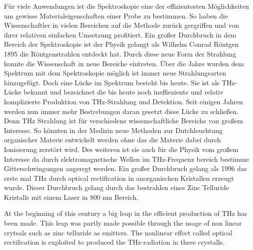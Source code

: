 Für viele Anwendungen ist die Spektroskopie eine der effizientesten Möglichkeiten um gewisse Materialeigenschaften einer Probe zu bestimmen.
So haben die Wissenschaftler in vielen Bereichen auf die Methode zurück gergriffen und von ihrer relativen einfachen Umsetzung profitiert.
Ein großer Durchbruch in dem Bereich der Spektroskopie ist der Physik gelangt als Wilhelm Conrad Röntgen 1895 %
die Röntgenstrahlen entdeckt hat.
Durch diese neue Form der Strahlung konnte die Wissenschaft in neue Bereiche eintreten.
Über die Jahre wurden dem Spektrum mit dem Spektroskopie möglich ist immer neue Strahlungsarten hinzugefügt.
Doch eine Lücke im Spektrum besteht bis heute.
Sie ist als THz-Lücke bekannt und bezeichnet die bis heute noch ineffieziente und relativ komplizierte Produktion von THz-Strahlung und Detektion.
Seit einigen Jahren werden nun immer mehr Bestrebungen daran gesetzt diese Lücke zu schließen.
Denn THz Strahlung ist für verschiedene wissenschaftliche Bereiche von großem Interesse.
So könnten in der Medizin neue Methoden zur Dutchleuchtung organischer Materie entwickelt werden ohne das die Materie dabei durch Ionisierung zerstört wird.
Des weiteren ist sie auch für die Physik vom großem Interesse da durch elektromagnetische Wellen im THz-Frequenz bereich bestimme Gitterschwingungen angeregt werden.
Ein großer Durchbruch gelang als 1996 das erste mal THz durch optical rectification in anorganischen Kristallen erzeugt wurde. %
Dieser Durchbruch gelang durch das bestrahlen eines Zinc Telluride Kristalls mit einem Laser in 800 nm Bereich.



At the beginning of this century a big leap in the efficient production of $\si{\tera\hertz}$ has been made.
This leap was partly made possible through the usage of non linear crytsals such as zinc telluride as emitters.
The nonlinear effect called optical rectification is exploited to produced the $\si{\tera\hertz}$-radiation in these crystalls.


